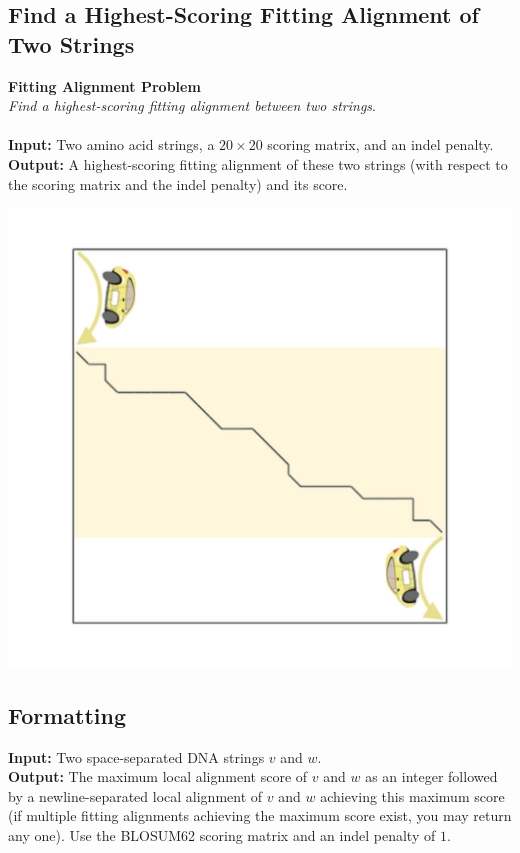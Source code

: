 \documentclass{article}
\begin{document}
\subsection{Find a Highest-Scoring Fitting Alignment of Two Strings}
\hline\vspace{5}
\textbf{Fitting Alignment Problem}\\
\emph{Find a highest-scoring fitting alignment between two strings}.\\ \\
\textbf{Input:} Two amino acid strings, a $20\times 20$ scoring matrix, and an indel penalty.\\
\textbf{Output:} A highest-scoring fitting alignment of these two strings (with respect to the scoring matrix and the indel penalty) and its score.
\begin{center}
    \includegraphics[scale=0.2]{c5/logos/5H.png}
\end{center}
\hline\vspace{5}

\subsection*{Formatting}
\noindent\textbf{Input:} Two space-separated DNA strings $v$ and $w$.\\
\noindent\textbf{Output:} The maximum local alignment score of $v$ and $w$ as an integer followed by a newline-separated local alignment of $v$ and $w$ achieving this maximum score (if multiple fitting alignments achieving the maximum score exist, you may return any one). Use the BLOSUM62 scoring matrix and an indel penalty of $1$.
\end{document}
